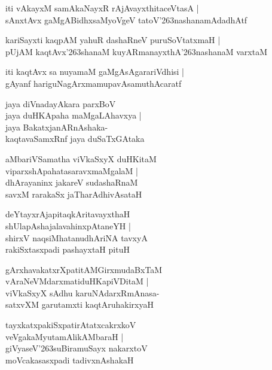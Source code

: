 \documentclass[twoside,12pt,openright]{book}
\def\S{\char'263}
\newcounter{shloka}[chapter]
\begin{document}
\begin{shloka}%
iti vAkayxM samAkaNayxR rAjAvayxthitaceVtasA |\\
sAnxtAvx gaMgABidhxsaMyoVgeV tatoV\S nashanamAdadhAtf
\end{shloka}

\begin{shloka}%
kariSayxti kaqpAM yahuR dashaRneV puruSoVtatxmaH |\\
pUjAM kaqtAvx\S shanaM kuyARmanayxthA\S nashanaM varxtaM 
\end{shloka}

\begin{shloka}%
iti kaqtAvx sa nuyamaM gaMgAsAgarariVdhisi |\\
gAyanf hariguNagArxmamupavAsamuthAcaratf
\end{shloka}

\begin{shloka}%
jaya diVnadayAkara parxBoV \\
jaya duHKApaha maMgaLAhavxya |\\
jaya BakatxjanARnAshaka- \\
kaqtavaSamxRnf jaya duSaTxGAtaka
\end{shloka}

\begin{shloka}%
aMbariVSamatha viVkaSxyX duHKitaM \\
viparxshApahatasaravxmaMgalaM |\\
dhArayaninx jakareV sudashaRnaM \\
savxM rarakaSx jaTharAdhivAsataH
\end{shloka}

\begin{shloka}%
deYtayxrAjapitaqkAritavayxthaH \\
shUlapAshajalavahinxpAtaneYH |\\
shirxV naqsiMhatanudhAriNA tavxyA \\
rakiSxtasxpadi pashayxtaH pituH 
\end{shloka}

\begin{shloka}%
gArxhavakatxrXpatitAMGirxmudaBxTaM \\
vAraNeVMdarxmatiduHKapiVDitaM |\\
viVkaSxyX sAdhu karuNAdarxRmAnasa- \\
satxvXM garutamxti kaqtAruhakirxyaH
\end{shloka}

\begin{shloka}%
tayxkatxpakiSxpatirAtatxcakrxkoV \\
veVgakaMyutamAlikAMbaraH |\\
giVyaseV\S suBiramuSayx nakarxtoV \\
moVcakasasxpadi tadivxnAshakaH 
\end{shloka}
\end{document}
